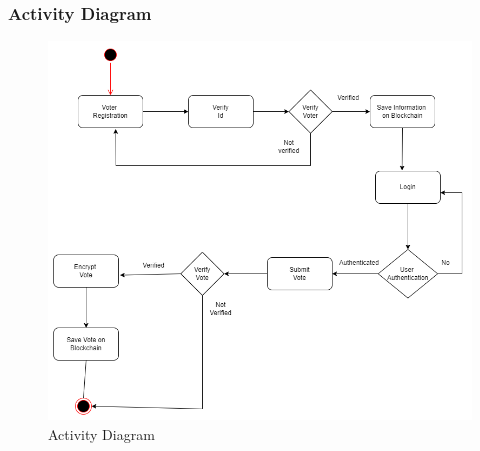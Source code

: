 \documentclass[oneside, 12pt]{book}
\begin{document}
\subsubsection{Activity Diagram}
\begin{figure}[H]
	\centering
	\includegraphics[width=\linewidth]{./Resources/activity.png}
	\caption{Activity Diagram}
	\label{fig:activity}
\end{figure}
\end{document}
